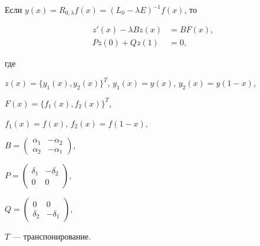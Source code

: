 \begin{lem}


Если $y(x)=R_{0,\lambda}f(x)=(L_0-\lambda E)^{-1}f(x)$, то


\begin{align}


z'(x)-\lambda Bz(x)&=BF(x), \\


Pz(0)+Qz(1)&=0,


\end{align}


где


$z(x)=\{y_1(x),y_2(x)\}^T$, $y_1(x)=y(x)$, $y_2(x)=y(1-x)$,


$F(x)=\{f_1(x),f_2(x)\}^T$,


$f_1(x)=f(x)$, $f_2(x)=f(1-x)$,


$B=\begin{pmatrix} \alpha_1&-\alpha_2\\ \alpha_2&-\alpha_1\end{pmatrix}$,


$P=\begin{pmatrix} \delta_1&-\delta_2\\ 0&0\end{pmatrix}$,


$Q=\begin{pmatrix} 0&0\\ \delta_2&-\delta_1\end{pmatrix}$,


$T$ --- транспонирование.


\end{lem}





